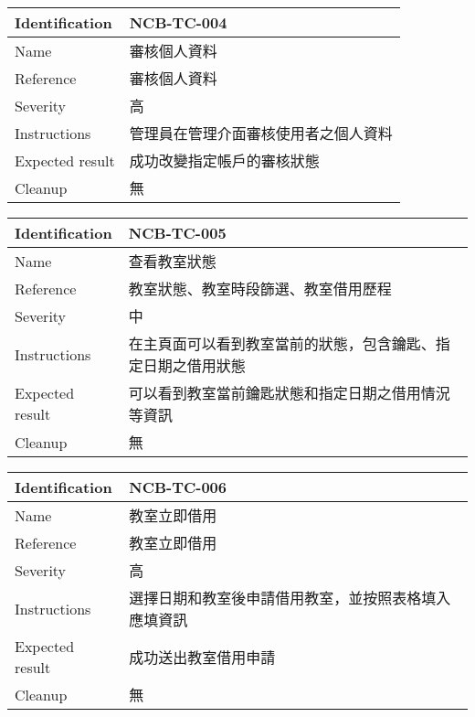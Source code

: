 \documentclass{article}
\begin{document}
\bigskip

\begin{tabularx}{\textwidth}{| A{0.3\textwidth} | X |}
	\hline
	Identification  & NCB-TC-004         \\ \hline
	Name            & 審核個人資料             \\ \hline
	Reference       & 審核個人資料             \\ \hline
	Severity        & 高                  \\ \hline
	Instructions    & 管理員在管理介面審核使用者之個人資料 \\ \hline
	Expected result & 成功改變指定帳戶的審核狀態      \\ \hline
	Cleanup         & 無                  \\ \hline
\end{tabularx}

\bigskip

\begin{tabularx}{\textwidth}{| A{0.3\textwidth} | X |}
	\hline
	Identification  & NCB-TC-005                     \\ \hline
	Name            & 查看教室狀態                         \\ \hline
	Reference       & 教室狀態、教室時段篩選、教室借用歷程             \\ \hline
	Severity        & 中                              \\ \hline
	Instructions    & 在主頁面可以看到教室當前的狀態，包含鑰匙、指定日期之借用狀態 \\ \hline
	Expected result & 可以看到教室當前鑰匙狀態和指定日期之借用情況等資訊      \\ \hline
	Cleanup         & 無                              \\ \hline
\end{tabularx}

\bigskip

\begin{tabularx}{\textwidth}{| A{0.3\textwidth} | X |}
	\hline
	Identification  & NCB-TC-006                 \\ \hline
	Name            & 教室立即借用                     \\ \hline
	Reference       & 教室立即借用                     \\ \hline
	Severity        & 高                          \\ \hline
	Instructions    & 選擇日期和教室後申請借用教室，並按照表格填入應填資訊 \\ \hline
	Expected result & 成功送出教室借用申請                 \\ \hline
	Cleanup         & 無                          \\ \hline
\end{tabularx}
\end{document}
